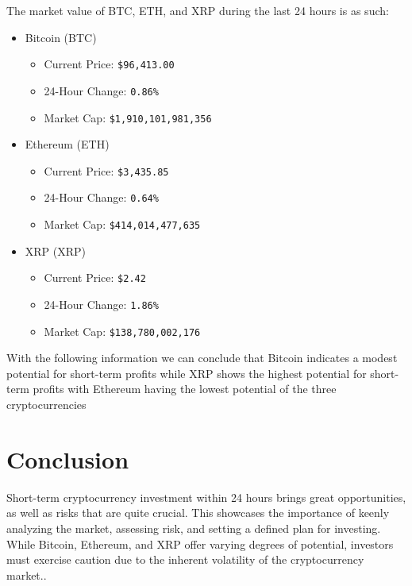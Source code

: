 \documentclass[12pt, a4paper]{article}
\begin{document}
The market value of BTC, ETH, and XRP during the last 24 hours is as such:
\begin{itemize}
    \item Bitcoin (BTC)
    \begin{itemize}
        \item Current Price: \verb|$96,413.00|
        \item 24-Hour Change: \verb|0.86%|
        \item Market Cap: \verb|$1,910,101,981,356|
    \end{itemize}

    \item Ethereum (ETH)
    \begin{itemize}
        \item Current Price: \verb|$3,435.85|
        \item 24-Hour Change: \verb|0.64%|
        \item Market Cap: \verb|$414,014,477,635|
    \end{itemize}

    \item XRP (XRP)
    \begin{itemize}
        \item Current Price: \verb|$2.42|
        \item 24-Hour Change: \verb|1.86%|
        \item Market Cap: \verb|$138,780,002,176|
    \end{itemize} 
    
\end{itemize}

With the following information we can conclude that Bitcoin indicates a modest potential for short-term profits while XRP shows the highest potential for short-term profits with Ethereum having the lowest potential of the three cryptocurrencies

\section{Conclusion}
Short-term cryptocurrency investment within 24 hours brings great opportunities, as well as risks that are quite crucial. This showcases the importance of keenly analyzing the market, assessing risk, and setting a defined plan for investing. While Bitcoin, Ethereum, and XRP offer varying degrees of potential, investors must exercise caution due to the inherent volatility of the cryptocurrency market..



   
   
   

  
\end{document}
